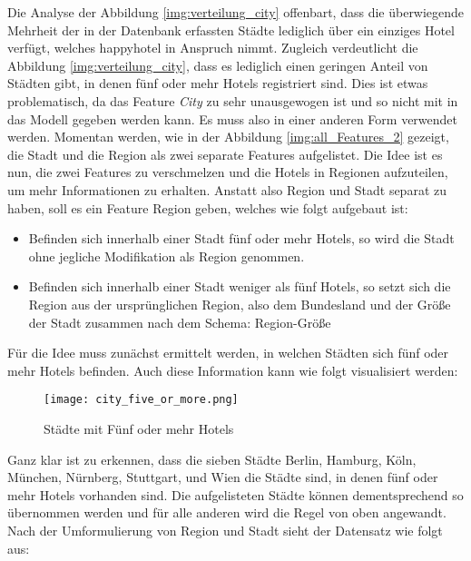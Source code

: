 Die Analyse der Abbildung \ref{img:verteilung_city} offenbart, dass die überwiegende Mehrheit der in der Datenbank erfassten Städte lediglich über ein einziges Hotel verfügt, welches happyhotel in Anspruch nimmt. Zugleich verdeutlicht die Abbildung \ref{img:verteilung_city}, dass es lediglich einen geringen Anteil von Städten gibt, in denen fünf oder mehr Hotels registriert sind. Dies ist etwas problematisch, da das Feature \emph{City} zu sehr unausgewogen ist und so nicht mit in das Modell gegeben werden kann. Es muss also in einer anderen Form verwendet werden.
\newline
\newline
Momentan werden, wie in der Abbildung \ref{img:all_Features_2} gezeigt, die Stadt und die Region als zwei separate Features aufgelistet. Die Idee ist es nun, die zwei Features zu verschmelzen und die Hotels in Regionen aufzuteilen, um mehr Informationen zu erhalten. Anstatt also Region und Stadt separat zu haben, soll es ein Feature Region geben, welches wie folgt aufgebaut ist: 

\begin{itemize}
    \item Befinden sich innerhalb einer Stadt fünf oder mehr Hotels, so wird die Stadt ohne jegliche Modifikation als Region genommen.
    \item Befinden sich innerhalb einer Stadt weniger als fünf Hotels, so setzt sich die Region aus der ursprünglichen Region, also dem Bundesland und der Größe der Stadt zusammen nach dem Schema: {Region}-{Größe}
\end{itemize}

Für die Idee muss zunächst ermittelt werden, in welchen Städten sich fünf oder mehr Hotels befinden. Auch diese Information kann wie folgt visualisiert werden:

\begin{figure}[h]
    \centering
    \texttt{[image: city\_five\_or\_more.png]}
    \caption[Städte mit Fünf oder mehr Hotels]{Städte mit Fünf oder mehr Hotels}
    \label{img:city_five_or_more}
\end{figure}

Ganz klar ist zu erkennen, dass die sieben Städte Berlin, Hamburg, Köln, München, Nürnberg, Stuttgart, und Wien die Städte sind, in denen fünf oder mehr Hotels vorhanden sind. Die aufgelisteten Städte können dementsprechend so übernommen werden und für alle anderen wird die Regel von oben angewandt.
\newline
Nach der Umformulierung von Region und Stadt sieht der Datensatz wie folgt aus:

